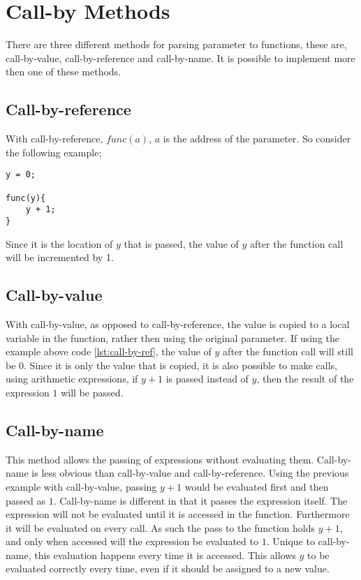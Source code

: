 \section{Call-by Methods}
There are three different methods for parsing parameter to functions, these are, call-by-value, call-by-reference and call-by-name. It is possible to implement more then one of these methods.
\subsection*{Call-by-reference}
With call-by-reference, $func(a)$, $a$ is the address of the parameter. So consider the following example;
\begin{lstlisting}[caption=call-by-reference example, label=lst:call-by-ref]
y = 0;

func(y){
	y + 1;
}
\end{lstlisting}
Since it is the location of $y$ that is passed, the value of $y$ after the function call will be incremented by 1.
\subsection*{Call-by-value}
With call-by-value, as opposed to call-by-reference, the value is copied to a local variable in the function, rather then using the original parameter. If using the example above code \ref{lst:call-by-ref}, the value of $y$ after the function call will still be $0$. Since it is only the value that  is copied, it is also possible to make calls, using arithmetic expressions, if $y+1$ is passed instead of $y$, then the result of the expression $1$ will be passed.
\subsection*{Call-by-name}
This method allows the passing of expressions without evaluating them. Call-by-name is less obvious than call-by-value and call-by-reference. Using the previous example with call-by-value, passing $y+1$ would be evaluated first and then passed as $1$. Call-by-name is different in that it passes the expression itself. The expression will not be evaluated until it is accessed in the function. Furthermore it will be evaluated on every call. As such the pass to the function holds $y+1$, and only when accessed will the expression be evaluated to $1$. Unique to call-by-name, this evaluation happens every time it is accessed. This allows $y$ to be evaluated correctly every time, even if it should be assigned to a new value.
